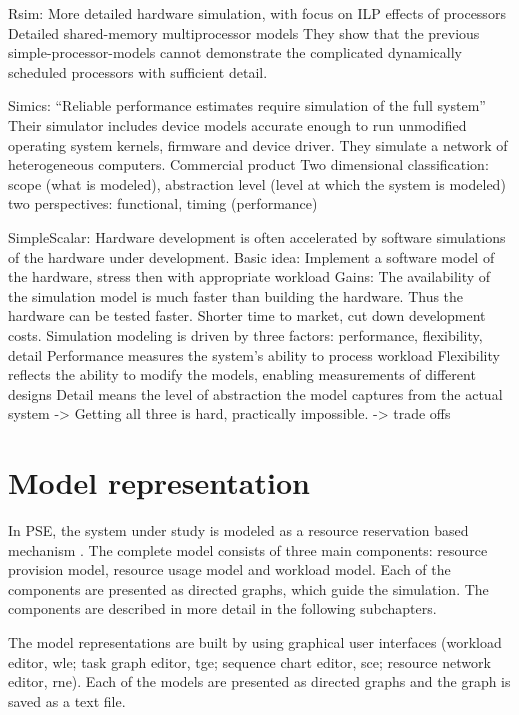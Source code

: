 Rsim: More detailed hardware simulation, with focus on ILP effects of processors
      Detailed shared-memory multiprocessor models
      They show that the previous simple-processor-models cannot demonstrate the complicated dynamically scheduled processors with sufficient detail.

Simics: ``Reliable performance estimates require simulation of the full system''
        Their simulator includes device models accurate enough to run unmodified operating system kernels, firmware and device driver.
        They simulate a network of heterogeneous computers.
        Commercial product
        Two dimensional classification:
          scope (what is modeled),
          abstraction level (level at which the system is modeled)
            two perspectives: functional, timing (performance)

SimpleScalar:
  Hardware development is often accelerated by software simulations of the hardware under development.
  Basic idea: Implement a software model of the hardware, stress then with appropriate workload
  Gains: The availability of the simulation model is much faster than building the hardware. Thus the hardware can be tested faster. Shorter time to market, cut down development costs.
  Simulation modeling is driven by three factors: performance, flexibility, detail
    Performance measures the system's ability to process workload
    Flexibility reflects the ability to modify the models, enabling measurements of different designs
    Detail means the level of abstraction the model captures from the actual system
    -> Getting all three is hard, practically impossible.
    -> trade offs


\section{Model representation}
In PSE, the system under study is modeled as a resource reservation based mechanism  \cite{Menasce:1994:CPP:174466}. The complete model consists of three main components: resource provision model, resource usage model and workload model. Each of the components are presented as directed graphs, which guide the simulation. The components are described in more detail in the following subchapters.

The model representations are built by using graphical user interfaces (workload editor, wle; task graph editor, tge; sequence chart editor, sce; resource network editor, rne). Each of the models are presented as directed graphs and the graph is saved as a text file.


